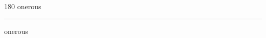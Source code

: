 
\begin{frame}
\begin{center}
\begin{turn}{180}
{\fontsize{2.5cm}{1em}\selectfont onerous}
\end{turn}
\vspace{1em}\par  
\hrule
\vspace{1em}\par  
{\fontsize{2.5cm}{1em}\selectfont onerous}
\end{center}
\end{frame}
